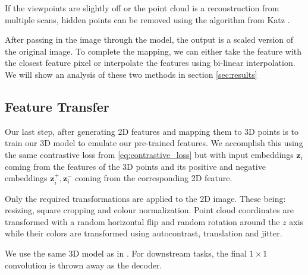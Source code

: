 \documentclass[10pt,twocolumn,letterpaper]{article}
\newcommand{\AJ}[1]{{\color{red}{[Andrej: #1]}}}
\begin{document}
If the viewpoints are slightly off or the point cloud is a reconstruction from multiple scans, hidden points can be removed using the algorithm from Katz \etal \cite{katz2007Direct}.

After passing in the image through the model, the output is a scaled version of the original image. To complete the mapping, we can either take the feature with the closest feature pixel or interpolate the features using bi-linear interpolation. We will show an analysis of these two methods in section \ref{sec:results}

\AJ{Do I need to give the equation for Bi-linear interpolation or is this also considered basic knowledge}

\subsection{Feature Transfer}
\label{sec:featureTransfer}

Our last step, after generating 2D features and mapping them to 3D points is to train our 3D model to emulate our pre-trained features. We accomplish this using the same contrastive loss from \ref{eq:contrastive_loss} but with input embeddings $\mathbf{z}_i$ coming from the features of the 3D points and its positive and negative embeddings $\mathbf{z}_i^{+},\mathbf{z}_i^{-}$ coming from the corresponding 2D feature.

Only the required transformations are applied to the 2D image. These being: resizing, square cropping and colour normalization. Point cloud coordinates are transformed with a random horizontal flip and random rotation around the $z$ axis while their colors are transformed using autocontrast, translation and jitter.

We use the same 3D model as in \cite{xie2020pointcontrast}. For downstream tasks, the final $1\times1$ convolution is thrown away as the decoder.

\AJ{Need to look at not using a projection head in 3D model.}
\end{document}
